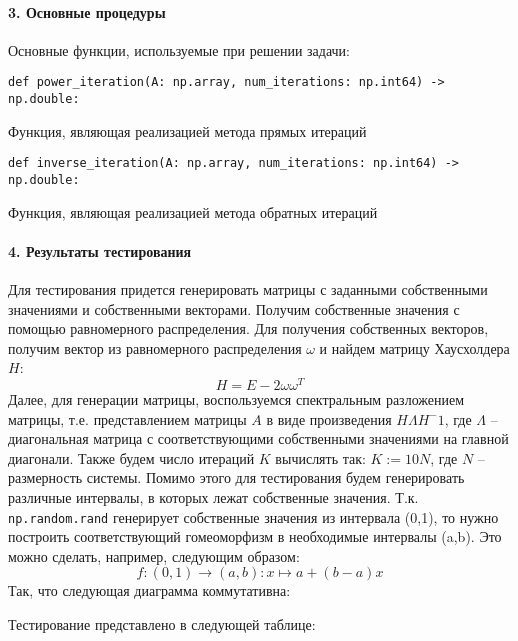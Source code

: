 \documentclass[11pt,a4paper]{report}
\begin{document}
\paragraph{3. Основные процедуры}
Основные функции, используемые при решении задачи:


\begin{lstlisting}
def power_iteration(A: np.array, num_iterations: np.int64) -> np.double:
\end{lstlisting}
Функция, являющая реализацией метода прямых итераций
\begin{lstlisting}
def inverse_iteration(A: np.array, num_iterations: np.int64) -> np.double:
\end{lstlisting}
Функция, являющая реализацией метода обратных итераций
\paragraph{4. Результаты тестирования}
Для тестирования придется генерировать матрицы с заданными собственными значениями и собственными векторами. Получим собственные значения с помощью равномерного распределения. Для получения собственных векторов, получим вектор из равномерного распределения $\omega$ и найдем матрицу Хаусхолдера $H$:
\[
	H = E - 2\omega\omega^T
\] Далее, для генерации матрицы, воспользуемся спектральным разложением матрицы, т.е. представлением матрицы $A$ в виде произведения $H\Lambda H^-1$, где  $\Lambda$ -- диагональная матрица с соответствующими собственными значениями на главной диагонали. Также будем число итераций $K$ вычислять так: $K:=10N$, где $N$ -- размерность системы. Помимо этого для тестирования будем генерировать различные интервалы, в которых лежат собственные значения. Т.к. \lstinline{np.random.rand} генерирует собственные значения из интервала (0,1), то нужно построить соответствующий гомеоморфизм в необходимые интервалы (a,b). Это можно сделать, например, следующим образом:
\[
	f:(0,1) \rightarrow (a,b): x \mapsto a + (b-a)x
\]  
Так, что следующая диаграмма коммутативна:
\begin{center}
\end{center}
Тестирование представлено в следующей таблице:
\end{document}
